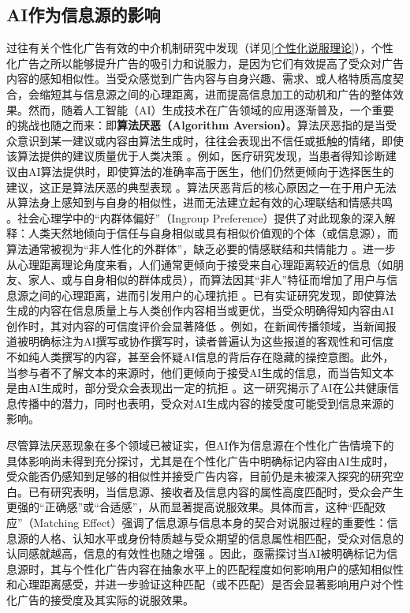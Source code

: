\subsection{AI作为信息源的影响}
过往有关个性化广告有效的中介机制研究中发现（详见\ref{个性化说服理论}），个性化广告之所以能够提升广告的吸引力和说服力，是因为它们有效提高了受众对广告内容的感知相似性。当受众感觉到广告内容与自身兴趣、需求、或人格特质高度契合，会缩短其与信息源之间的心理距离，进而提高信息加工的动机和广告的整体效果。然而，随着人工智能（AI）生成技术在广告领域的应用逐渐普及，一个重要的挑战也随之而来：即\textbf{算法厌恶（Algorithm Aversion）}。算法厌恶指的是当受众意识到某一建议或内容由算法生成时，往往会表现出不信任或抵触的情绪，即使该算法提供的建议质量优于人类决策 \citep{dietvorst2015algorithm}。例如，医疗研究发现，当患者得知诊断建议由AI算法提供时，即使算法的准确率高于医生，他们仍然更倾向于选择医生的建议，这正是算法厌恶的典型表现 \citep{longoni2019resistance}。算法厌恶背后的核心原因之一在于用户无法从算法身上感知到与自身的相似性，进而无法建立起有效的心理联结和情感共鸣 \citep{dang2024extended}。社会心理学中的“内群体偏好”（Ingroup Preference）提供了对此现象的深入解释：人类天然地倾向于信任与自身相似或具有相似价值观的个体（或信息源），而算法通常被视为“非人性化的外群体”，缺乏必要的情感联结和共情能力 \citep{turel2023prejudiced}。进一步从心理距离理论角度来看，人们通常更倾向于接受来自心理距离较近的信息（如朋友、家人、或与自身相似的群体成员），而算法因其“非人”特征而增加了用户与信息源之间的心理距离，进而引发用户的心理抗拒 \citep{castelo2019task}。已有实证研究发现，即使算法生成的内容在信息质量上与人类创作内容相当或更优，当受众明确得知内容由AI创作时，其对内容的可信度评价会显著降低 \citep{lin5080378visible, khan2024ai, li2024impact}。例如，在新闻传播领域，当新闻报道被明确标注为AI撰写或协作撰写时，读者普遍认为这些报道的客观性和可信度不如纯人类撰写的内容，甚至会怀疑AI信息的背后存在隐藏的操控意图。此外，当参与者不了解文本的来源时，他们更倾向于接受AI生成的信息，而当告知文本是由AI生成时，部分受众会表现出一定的抗拒 \citep{karinshak2023working}。这一研究揭示了AI在公共健康信息传播中的潜力，同时也表明，受众对AI生成内容的接受度可能受到信息来源的影响。

尽管算法厌恶现象在多个领域已被证实，但AI作为信息源在个性化广告情境下的具体影响尚未得到充分探讨，尤其是在个性化广告中明确标记内容由AI生成时，受众能否仍感知到足够的相似性并接受广告内容，目前仍是未被深入探究的研究空白。已有研究表明，当信息源、接收者及信息内容的属性高度匹配时，受众会产生更强的“正确感”或“合适感”，从而显著提高说服效果\citep{cesario2004regulatory}。具体而言，这种“匹配效应”（Matching Effect）强调了信息源与信息本身的契合对说服过程的重要性：信息源的人格、认知水平或身份特质越与受众期望的信息属性相匹配，受众对信息的认同感就越高，信息的有效性也随之增强 \citep{brinol2009source}。因此，亟需探讨当AI被明确标记为信息源时，其与个性化广告内容在抽象水平上的匹配程度如何影响用户的感知相似性和心理距离感受，并进一步验证这种匹配（或不匹配）是否会显著影响用户对个性化广告的接受度及其实际的说服效果。


